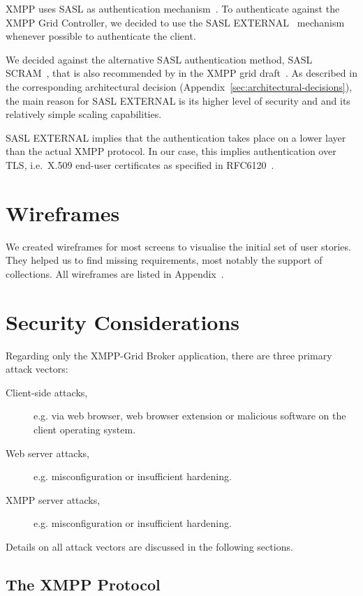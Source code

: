 XMPP uses SASL as authentication mechanism~\cite{rfc6120}.
To authenticate against the XMPP Grid Controller, we decided to use the SASL EXTERNAL~\cite{rfc4422} mechanism whenever possible to authenticate the client.

We decided against the alternative SASL authentication method, SASL SCRAM~\cite{rfc7677}, that is also recommended by in the XMPP grid draft~\cite{ietf-mile-xmpp-grid-05}.
As described in the corresponding architectural decision (Appendix~\ref{sec:architectural-decisions}), the main reason for SASL EXTERNAL is its higher level of security and and its relatively simple scaling capabilities.

SASL EXTERNAL implies that the authentication takes place on a lower layer than the actual XMPP protocol. In our case, this implies authentication over TLS, i.e.~X.509 end-user certificates as specified in RFC6120~\cite{rfc6120}.


\section{Wireframes}

We created wireframes for most screens to visualise the initial set of user stories.
They helped us to find missing requirements, most notably the support of collections.
All wireframes are listed in Appendix~.

\section{Security Considerations}\label{sec:security-considerations}

Regarding only the XMPP-Grid Broker application, there are three primary attack vectors:

\begin{description}
    \item[Client-side attacks,] e.g. via web browser, web browser extension or malicious software on the client operating system.
    \item[Web server attacks,] e.g. misconfiguration or insufficient hardening.
    \item[XMPP server attacks,] e.g. misconfiguration or insufficient hardening.
\end{description}

Details on all attack vectors are discussed in the following sections.

\subsection{The XMPP Protocol}

